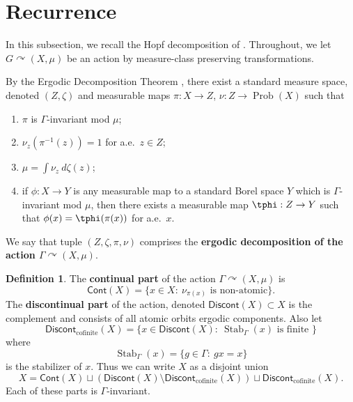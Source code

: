 \documentclass[12pt]{article}
\theoremstyle{plain}
\theoremstyle{definition}
\newtheorem{defn}{Definition}
\theoremstyle{remark}
\newcommand{\G}{\Gamma}
\newcommand\Prob{\operatorname{Prob}}
\newcommand\Stab{\operatorname{Stab}}
\def\cc{{\curvearrowright}}
\begin{document}
\appendix

\section{Recurrence}\label{S:recurrence}



In this subsection, we recall the Hopf decomposition of \cite{MR2731695}. Throughout, we let $G \cc (X,\mu)$ be an action by measure-class preserving transformations. 



By the Ergodic Decomposition Theorem \cite{MR1784210}, there exist a standard measure space, denoted $(Z,\zeta)$ and measurable maps $\pi:X \to Z$, $\nu:Z \to \Prob(X)$ such that 
\begin{enumerate}
\item $\pi$ is $\G$-invariant mod $\mu$;
\item $\nu_z(\pi^{-1}(z))=1$ for a.e.\ $z\in Z$;
    \item $\mu = \int \nu_z~d\zeta(z)$;
    \item if $\phi:X \to Y$ is any measurable map to a standard Borel space $Y$ which is $\G$-invariant mod $\mu$, then there exists a measurable map $\tphi:Z \to Y$ such that $\phi(x) = \tphi(\pi(x))$ for a.e.\ $x$.
\end{enumerate}
We say that tuple $(Z,\zeta, \pi, \nu)$ comprises the \textbf{ergodic decomposition of the action $\G \cc (X,\mu)$}. 



\begin{defn}\label{D:Hopf}
   The \textbf{continual part} of the action $\G \cc (X,\mu)$ is 
   $$\mathsf{Cont}(X)=\{x\in X:~ \nu_{\pi(x)} \textrm{ is non-atomic}\}.$$
The \textbf{discontinual part} of the action, denoted $\mathsf{Discont}(X) \subset X$ is the complement and consists of all atomic orbits ergodic components. Also let 
$$\mathsf{Discont}_{\textrm{cofinite}}(X)=\{ x\in \mathsf{Discont}(X):~ \Stab_\G(x) \textrm{ is finite }\}$$
   where   $$\Stab_\G(x)=\{g\in \G:~ gx=x\}$$
is the stabilizer of $x$. Thus we can write $X$ as a disjoint union
$$X = \mathsf{Cont}(X) \sqcup (\mathsf{Discont}(X)\setminus  \mathsf{Discont}_{\textrm{cofinite}}(X))\sqcup \mathsf{Discont}_{\textrm{cofinite}}(X).$$
Each of these parts is $\G$-invariant.
\end{defn}
\end{document}
